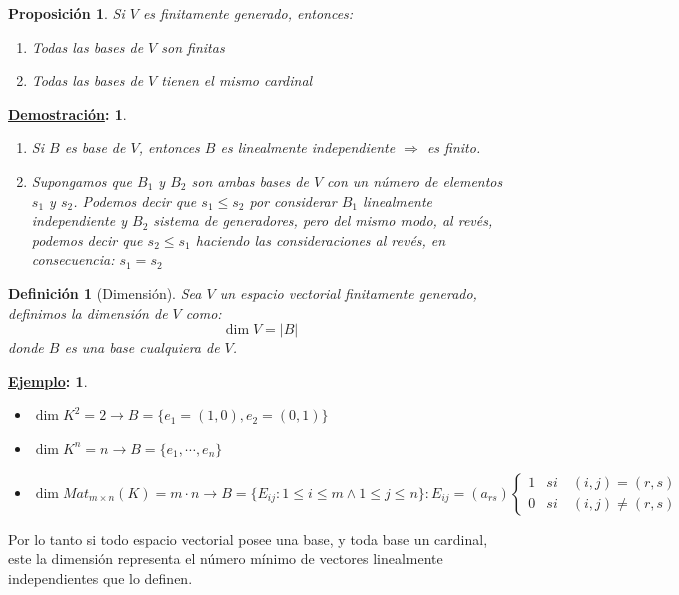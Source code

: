 \documentclass[10pt,a4paper,openright]{book}
\theoremstyle{break}
\newtheorem*{defi}{Definición}
\newtheorem*{prop}{Proposición}
\newtheorem*{demo}{\underline{Demostración}:}
\newtheorem*{ej}{\underline{Ejemplo}:}
\begin{document}
\begin{prop}
Si $V$ es finitamente generado, entonces:
\begin{enumerate}
\item Todas las bases de $V$ son finitas
\item Todas las bases de $V$ tienen el mismo cardinal
\end{enumerate}
\end{prop}
\begin{demo}
\begin{enumerate}
\item Si $B$ es base de $V$, entonces $B$ es linealmente independiente $\Rightarrow$ es finito.

\item Supongamos que $B_1$ y $B_2$ son ambas bases de $V$ con un número de elementos $s_1$ y $s_2$. Podemos decir que $s_1\leq s_2$ por considerar $B_1$ linealmente independiente y $B_2$ sistema de generadores, pero del mismo modo, al revés, podemos decir que $s_2\leq s_1$ haciendo las consideraciones al revés, en consecuencia: $s_1=s_2$
\end{enumerate}
\end{demo}

\begin{defi}[Dimensión]
Sea $V$ un espacio vectorial finitamente generado, definimos la dimensión de $V$ como:
$$\dim V=|B|$$
donde $B$ es una base cualquiera de $V$.
\end{defi}

\begin{ej}
\begin{itemize}
\item $\dim K^2=2\rightarrow B=\{e_1=(1,0), e_2=(0,1)\}$
\item $\dim K^n=n\rightarrow B=\{e_1, \cdots, e_n\}$
\item $\dim Mat_{m\times n}(K)=m\cdot n\rightarrow B=\{E_{ij}: 1\leq i\leq m \wedge 1\leq j\leq n\}: E_{ij}=(a_{rs})\begin{cases}
1 & si \quad (i,j)=(r,s) \\
0 & si \quad(i,j)\neq (r,s)
\end{cases}$
\end{itemize}
\end{ej}
Por lo tanto si todo espacio vectorial posee una base, y toda base un cardinal, este la dimensión representa el número mínimo de vectores linealmente independientes que lo definen.
\end{document}

